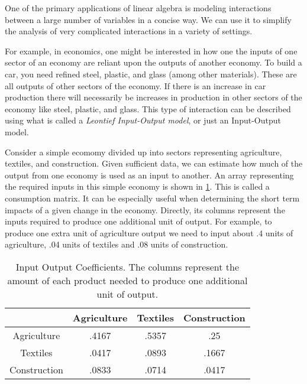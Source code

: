 \label{Leontief}


One of the primary applications of linear algebra is modeling interactions between a large number of variables in a concise way.
We can use it to simplify the analysis of very complicated interactions in a variety of settings.

For example, in economics, one might be interested in how one the inputs of one sector of an economy are reliant upon the outputs of another economy.
To build a car, you need refined steel, plastic, and glass (among other materials).
These are all outputs of other sectors of the economy.
If there is an increase in car production there will necessarily be increases in production in other sectors of the economy like steel, plastic, and glass.
This type of interaction can be described using what is called a \emph{Leontief Input-Output model}, or just an Input-Output model.

Consider a simple ecomomy divided up into sectors representing agriculture, textiles, and construction.
Given sufficient data, we can estimate how much of the output from one economy is used as an input to another.
An array representing the required inputs in this simple economy is shown in \ref{IOCoefTable}.
This is called a consumption matrix.
It can be especially useful when determining the short term impacts of a given change in the economy.
Directly, its columns represent the inputs required to produce one additional unit of output.
For example, to produce one extra unit of agriculture output we need to input about .4 units of agriculture, .04 units of textiles and .08 units of construction.

\begin{table}
\begin{center}
\begin{tabular}{|c|c|c|c|}
\hline
& Agriculture & Textiles & Construction \\ \hline
Agriculture & .4167 & .5357 & .25 \\ \hline
Textiles & .0417 & .0893 & .1667 \\ \hline
Construction & .0833 & .0714 & .0417 \\ \hline
\end{tabular}
\caption{Input Output Coefficients.
The columns represent the amount of each product needed to produce one additional unit of output.}
\label{IOCoefTable}
\end{center}
\end{table}

